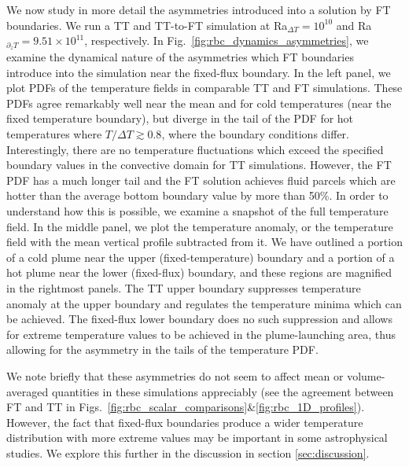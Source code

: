 \documentclass[aps, pre, onecolumn, nofootinbib, notitlepage, groupedaddress, amsfonts, amssymb, amsmath, longbibliography, superscriptaddress]{revtex4-1}
\begin{document}
We now study in more detail the asymmetries introduced into a solution by FT boundaries.
We run a TT and TT-to-FT simulation at Ra$_{\Delta T} = 10^{10}$ and Ra$_{\partial_z T} = 9.51 \times 10^{11}$, respectively.
In Fig.~\ref{fig:rbc_dynamics_asymmetries}, we examine the dynamical nature of the asymmetries which FT boundaries introduce into the simulation near the fixed-flux boundary.
In the left panel, we plot PDFs of the temperature fields in comparable TT and FT simulations.
These PDFs agree remarkably well near the mean and for cold temperatures (near the fixed temperature boundary), but diverge in the tail of the PDF for hot temperatures where $T/\Delta T \gtrsim 0.8$, where the boundary conditions differ.
Interestingly, there are no temperature fluctuations which exceed the specified boundary values in the convective domain for TT simulations.
However, the FT PDF has a much longer tail and the FT solution achieves fluid parcels which are hotter than the average bottom boundary value by more than 50\%.
In order to understand how this is possible, we examine a snapshot of the full temperature field.
In the middle panel, we plot the temperature anomaly, or the temperature field with the mean vertical profile subtracted from it.
We have outlined a portion of a cold plume near the upper (fixed-temperature) boundary and a portion of a hot plume near the lower (fixed-flux) boundary, and these regions are magnified in the rightmost panels.
The TT upper boundary suppresses temperature anomaly at the upper boundary and regulates the temperature minima which can be achieved.
The fixed-flux lower boundary does no such suppression and allows for extreme temperature values to be achieved in the plume-launching area, thus allowing for the asymmetry in the tails of the temperature PDF.

We note briefly that these asymmetries do not seem to affect mean or volume-averaged quantities in these simulations appreciably (see the agreement between FT and TT in Figs.~\ref{fig:rbc_scalar_comparisons}\&\ref{fig:rbc_1D_profiles}).
However, the fact that fixed-flux boundaries produce a wider temperature distribution with more extreme values may be important in some astrophysical studies.
We explore this further in the discussion in section \ref{sec:discussion}.
\end{document}
